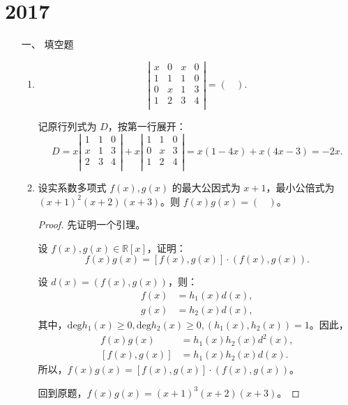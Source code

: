 \section{2017}
\begin{enumerate}[1~]
\renewcommand{\labelenumi}{\textbf{\theenumi. }}
\renewcommand{\Im}{\text{Im }}
\item[一、]填空题 
\begin{enumerate}[1.~]
\item
$$
\left| \begin{matrix}
	x&		0&		x&		0\\
	1&		1&		1&		0\\
	0&		x&		1&		3\\
	1&		2&		3&		4\\
\end{matrix} \right|=\left( \ \ \ \ \right).
$$

\begin{solution}
记原行列式为 $D$，按第一行展开：\[
D=x\left| \begin{matrix}
	1&		1&		0\\
	x&		1&		3\\
	2&		3&		4\\
\end{matrix} \right|+x\left| \begin{matrix}
	1&		1&		0\\
	0&		x&		3\\
	1&		2&		4\\
\end{matrix} \right|=x\left( 1-4x \right) +x\left( 4x-3 \right) = -2x.
\]
\end{solution}

\item 
设实系数多项式 $f(x), g(x)$ 的最大公因式为 $x + 1$，最小公倍式为 $(x + 1)^2(x + 2)(x + 3)$。则 $f(x)g(x) = (\ \ \ \ )$。
\begin{proof}
先证明一个引理。
\begin{lemma}\label{jinbeiyin}
设 $f(x), g(x) \in \mathbb{R}[x]$，证明：\[
f(x)g(x)=[f(x), g(x)]\cdot (f(x), g(x)).
\]
\end{lemma}
\begin{subproof}
设 $d(x)=(f(x), g(x))$，则：\begin{align*}
f(x)&=h_1 (x) d(x), \\
g(x)&=h_2(x) d(x), 
\end{align*}
其中，$\mathrm{deg} h_1 (x) \ge 0, \mathrm{deg} h_2(x)\ge 0, (h_1(x), h_2(x))=1$。因此，\begin{align*}
f(x)g(x)&=h_1(x)h_2(x)d^2(x),\\
[f(x), g(x)]&=h_1 (x) h_2(x)d(x).
\end{align*}
所以，$f(x)g(x)=[f(x), g(x)]\cdot (f(x), g(x))$。
\end{subproof}
回到原题，$f(x)g(x)=(x+1)^3 (x+2) (x+3)$。
\end{proof}


\end{enumerate}
\end{enumerate}
